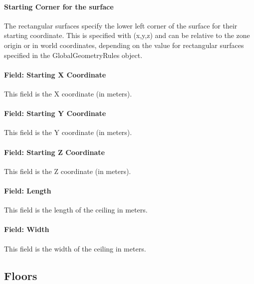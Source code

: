 \paragraph{Starting Corner for the surface}\label{starting-corner-for-the-surface-6}

The rectangular surfaces specify the lower left corner of the surface for their starting coordinate. This is specified with (x,y,z) and can be relative to the zone origin or in world coordinates, depending on the value for rectangular surfaces specified in the GlobalGeometryRules object.

\paragraph{Field: Starting X Coordinate}\label{field-starting-x-coordinate-6}

This field is the X coordinate (in meters).

\paragraph{Field: Starting Y Coordinate}\label{field-starting-y-coordinate-6}

This field is the Y coordinate (in meters).

\paragraph{Field: Starting Z Coordinate}\label{field-starting-z-coordinate-6}

This field is the Z coordinate (in meters).

\paragraph{Field: Length}\label{field-length-6}

This field is the length of the ceiling in meters.

\paragraph{Field: Width}\label{field-width-2}

This field is the width of the ceiling in meters.

\subsection{Floors}\label{floors}

